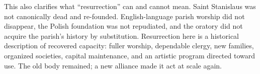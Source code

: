 This also clarifies what ``resurrection'' can and cannot mean. Saint Stanislaus was not canonically dead and re-founded. English-language parish worship did not disappear, the Polish foundation was not repudiated, and the oratory did not acquire the parish's history by substitution. Resurrection here is a historical description of recovered capacity: fuller worship, dependable clergy, new families, organized societies, capital maintenance, and an artistic program directed toward use. The old body remained; a new alliance made it act at scale again.

